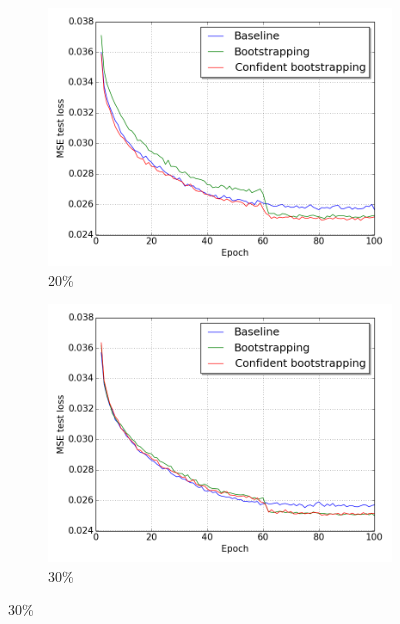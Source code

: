 \begin{figure}[H]
\begin{subfigure}{0.31\textwidth}
\end{subfigure}
\hspace*{\fill} %
\begin{subfigure}{0.31\textwidth}
\includegraphics[width=\textwidth]{figs/E2/lc_2.png}
\caption{20\% } \label{fig:app_E2_2_lc}
\vspace{-0.1cm} %
\end{subfigure}
\begin{subfigure}{0.31\textwidth}
\includegraphics[width=\textwidth]{figs/E2/lc_3.png}
\caption{ 30\%} \label{fig:app_E2_3_lc}
\vspace{-0.1cm} %

\end{subfigure}
\end{figure}
